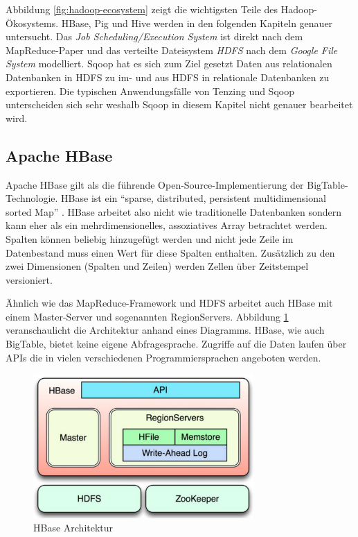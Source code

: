 \documentclass[a4paper]{article}
\begin{document}
Abbildung \ref{fig:hadoop-ecosystem} zeigt die wichtigsten Teile des Hadoop-Ökosystems. HBase, Pig und Hive werden in den folgenden Kapiteln genauer untersucht. Das \textit{Job Scheduling/Execution System} ist direkt nach dem MapReduce-Paper und das verteilte Dateisystem \textit{HDFS} nach dem \textit{Google File System} \cite{GFS} modelliert. Sqoop hat es sich zum Ziel gesetzt Daten aus relationalen Datenbanken in HDFS zu im- und aus HDFS in relationale Datenbanken zu exportieren. Die typischen Anwendungsfälle von Tenzing und Sqoop unterscheiden sich sehr weshalb Sqoop in diesem Kapitel nicht genauer bearbeitet wird.

\subsection{Apache HBase}
Apache HBase \cite{HBase} gilt als die führende Open-Source-Implementierung der BigTable-Technologie\cite{BigTable}. HBase ist ein \enquote{sparse, distributed, persistent multidimensional sorted Map} \cite{JavaMagazin}. HBase arbeitet also nicht wie traditionelle Datenbanken sondern kann eher als ein mehrdimensionelles, assoziatives Array betrachtet werden. Spalten können beliebig hinzugefügt werden und nicht jede Zeile im Datenbestand muss einen Wert für diese Spalten enthalten. Zusätzlich zu den zwei Dimensionen (Spalten und Zeilen) werden Zellen über Zeitstempel versioniert.

Ähnlich wie das MapReduce-Framework und HDFS arbeitet auch HBase mit einem Master-Server und sogenannten RegionServers. Abbildung \ref{fig:hbase} veranschaulicht die Architektur anhand eines Diagramms. HBase, wie auch BigTable, bietet keine eigene Abfragesprache. Zugriffe auf die Daten laufen über APIs die in vielen verschiedenen Programmiersprachen angeboten werden.

\begin{figure}[H]
\centering
\includegraphics[width=0.75\textwidth]{hbase-architecture.png}
\caption{HBase Architektur \cite{docstoc}}
\label{fig:hbase}
\end{figure}
\end{document}
